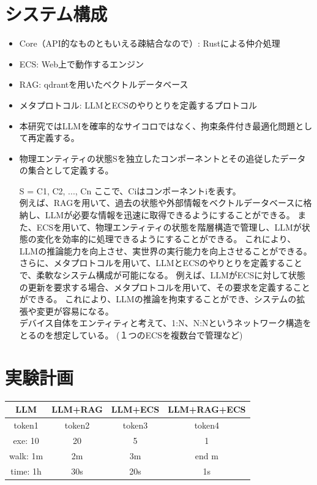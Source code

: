 \documentclass{article}
\begin{document}
    \section{システム構成}
    \begin{itemize}
        \item Core（API的なものともいえる疎結合なので）: Rustによる仲介処理
        \item ECS: Web上で動作するエンジン
        \item RAG: qdrantを用いたベクトルデータベース
        \item メタプロトコル: LLMとECSのやりとりを定義するプロトコル
    \end{itemize}
    \begin{itemize}
        \item 本研究ではLLMを確率的なサイコロではなく、拘束条件付き最適化問題として再定義する。
        \item 物理エンティティの状態Sを独立したコンポーネントとその追従したデータの集合として定義する。
        
            S = {C1, C2, ..., Cn} ここで、Ciはコンポーネントiを表す。 \\
    例えば、RAGを用いて、過去の状態や外部情報をベクトルデータベースに格納し、LLMが必要な情報を迅速に取得できるようにすることができる。
    また、ECSを用いて、物理エンティティの状態を階層構造で管理し、LLMが状態の変化を効率的に処理できるようにすることができる。
    これにより、LLMの推論能力を向上させ、実世界の実行能力を向上させることができる。
    さらに、メタプロトコルを用いて、LLMとECSのやりとりを定義することで、柔軟なシステム構成が可能になる。
    例えば、LLMがECSに対して状態の更新を要求する場合、メタプロトコルを用いて、その要求を定義することができる。
    これにより、LLMの推論を拘束することができ、システムの拡張や変更が容易になる。 \\
    デバイス自体をエンティティと考えて、1:N、N:Nというネットワーク構造をとるのを想定している。
    (１つのECSを複数台で管理など)
    \end{itemize}

    \section{実験計画}
        \begin{table}[h]
        \centering
        \begin{tabular}{|c|c|c|c|}
            \hline
            LLM & LLM+RAG & LLM+ECS & LLM+RAG+ECS \\
            \hline
            token1 & token2 & token3 & token4 \\
            exe: 10 & 20 & 5 & 1 \\
            walk: 1m & 2m & 3m & end m \\
            time: 1h & 30s & 20s & 1s \\
            \hline
        
        \end{tabular}
    \end{table}
\end{document}
